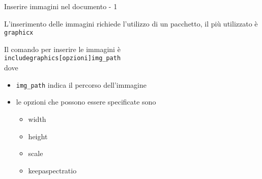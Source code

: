 \begin{frame}{Inserire immagini nel documento - 1}
	
L'inserimento delle immagini richiede l'utilizzo di un pacchetto, il più
utilizzato è \texttt{graphicx}

\vfill

Il comando per inserire le immagini è \\
\texttt{includegraphics[opzioni]{img\_path}} \\
dove

\begin{itemize}
	\item \texttt{img\_path} indica il percorso dell'immagine
	\item le opzioni che possono essere specificate sono
	\begin{itemize}
		\item width
		\item height
		\item scale
		\item keepaspectratio
	\end{itemize}
\end{itemize}

\end{frame}